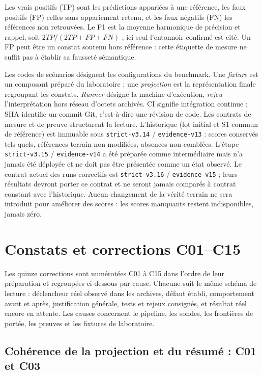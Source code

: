 \documentclass[11pt,a4paper]{article}
\newcommand{\code}[1]{{\urlstyle{tt}\nolinkurl{#1}}}
\begin{document}
Les vrais positifs (TP) sont les prédictions appariées à une référence, les faux positifs (FP) celles sans appariement retenu, et les faux négatifs (FN) les références non retrouvées. Le F1 est la moyenne harmonique de précision et rappel, soit $2TP/(2TP+FP+FN)$ ; ici seul l’entonnoir confirmé est cité. Un FP peut être un constat soutenu hors référence : cette étiquette de mesure ne suffit pas à établir sa fausseté sémantique.

Les codes de scénarios désignent les configurations du benchmark. Une \emph{fixture} est un composant préparé du laboratoire ; une \emph{projection} est la représentation finale regroupant les constats. \emph{Runner} désigne la machine d'exécution, \emph{rejeu} l'interprétation hors réseau d'octets archivés. CI signifie intégration continue ; SHA identifie un commit Git, c'est-à-dire une révision de code. Les contrats de mesure et de preuve structurent la lecture. L'historique (lot initial et S1 commun de référence) est immuable sous \code{strict-v3.14} / \code{evidence-v13} : scores conservés tels quels, références terrain non modifiées, absences non comblées. L'étape \code{strict-v3.15} / \code{evidence-v14} a été préparée comme intermédiaire mais n'a jamais été déployée et ne doit pas être présentée comme un état observé. Le contrat actuel des runs correctifs est \code{strict-v3.16} / \code{evidence-v15} ; leurs résultats devront porter ce contrat et ne seront jamais comparés à contrat constant avec l'historique. Aucun changement de la vérité terrain ne sera introduit pour améliorer des scores : les scores manquants restent indisponibles, jamais zéro.

\section{Constats et corrections C01--C15}
\label{sec:corrections}

Les quinze corrections sont numérotées C01 à C15 dans l'ordre de leur préparation et regroupées ci-dessous par cause. Chacune suit le même schéma de lecture : déclencheur réel observé dans les archives, défaut établi, comportement avant et après, justification générale, tests et rejeux consignés, et résultat réel encore en attente. Les causes concernent le pipeline, les sondes, les frontières de portée, les preuves et les fixtures de laboratoire.

\subsection{Cohérence de la projection et du résumé : C01 et C03}
\label{sec:proj}
\end{document}
